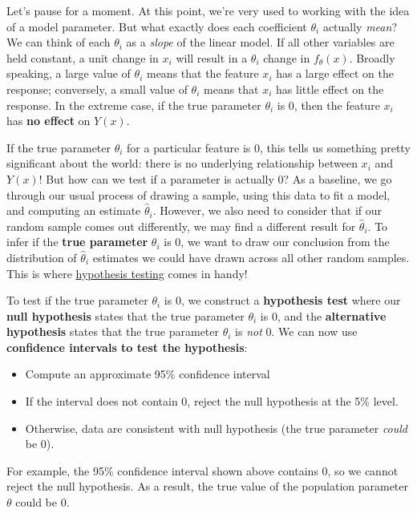 \documentclass[
  letterpaper,
  DIV=11,
  numbers=noendperiod]{scrreprt}
\providecommand{\tightlist}{%
  \setlength{\itemsep}{0pt}\setlength{\parskip}{0pt}}\usepackage{longtable,booktabs,array}
\begin{document}
Let's pause for a moment. At this point, we're very used to working with
the idea of a model parameter. But what exactly does each coefficient
\(\theta_i\) actually \emph{mean}? We can think of each \(\theta_i\) as
a \emph{slope} of the linear model. If all other variables are held
constant, a unit change in \(x_i\) will result in a \(\theta_i\) change
in \(f_{\theta}(x)\). Broadly speaking, a large value of \(\theta_i\)
means that the feature \(x_i\) has a large effect on the response;
conversely, a small value of \(\theta_i\) means that \(x_i\) has little
effect on the response. In the extreme case, if the true parameter
\(\theta_i\) is 0, then the feature \(x_i\) has \textbf{no effect} on
\(Y(x)\).

If the true parameter \(\theta_i\) for a particular feature is 0, this
tells us something pretty significant about the world: there is no
underlying relationship between \(x_i\) and \(Y(x)\)! But how can we
test if a parameter is actually 0? As a baseline, we go through our
usual process of drawing a sample, using this data to fit a model, and
computing an estimate \(\hat{\theta}_i\). However, we also need to
consider that if our random sample comes out differently, we may find a
different result for \(\hat{\theta}_i\). To infer if the \textbf{true
parameter} \(\theta_i\) is 0, we want to draw our conclusion from the
distribution of \(\hat{\theta}_i\) estimates we could have drawn across
all other random samples. This is where
\href{https://inferentialthinking.com/chapters/11/Testing_Hypotheses.html}{hypothesis
testing} comes in handy!

To test if the true parameter \(\theta_i\) is 0, we construct a
\textbf{hypothesis test} where our \textbf{null hypothesis} states that
the true parameter \(\theta_i\) is 0, and the \textbf{alternative
hypothesis} states that the true parameter \(\theta_i\) is \emph{not} 0.
We can now use \textbf{confidence intervals to test the hypothesis}:

\begin{itemize}
\tightlist
\item
  Compute an approximate 95\% confidence interval
\item
  If the interval does not contain 0, reject the null hypothesis at the
  5\% level.
\item
  Otherwise, data are consistent with null hypothesis (the true
  parameter \emph{could} be 0).
\end{itemize}

For example, the 95\% confidence interval shown above contains 0, so we
cannot reject the null hypothesis. As a result, the true value of the
population parameter \(\theta\) could be 0.
\end{document}
